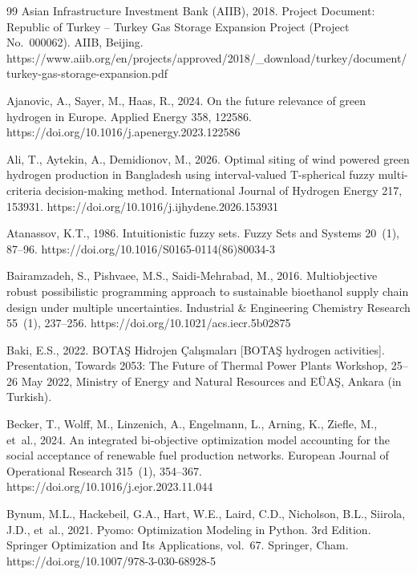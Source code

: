 \documentclass[preprint,12pt,authoryear]{elsarticle}
\begin{document}

\begin{thebibliography}{99}
Asian Infrastructure Investment Bank (AIIB), 2018. Project Document: Republic of Turkey -- Turkey Gas Storage Expansion Project (Project No.~000062). AIIB, Beijing. https://www.aiib.org/en/projects/approved/2018/\_download/turkey/document/turkey-gas-storage-expansion.pdf

Ajanovic, A., Sayer, M., Haas, R., 2024. On the future relevance of green hydrogen in Europe. Applied Energy 358, 122586. https://doi.org/10.1016/j.apenergy.2023.122586

Ali, T., Aytekin, A., Demidionov, M., 2026. Optimal siting of wind powered green hydrogen production in Bangladesh using interval-valued T-spherical fuzzy multi-criteria decision-making method. International Journal of Hydrogen Energy 217, 153931. https://doi.org/10.1016/j.ijhydene.2026.153931

Atanassov, K.T., 1986. Intuitionistic fuzzy sets. Fuzzy Sets and Systems 20~(1), 87--96. https://doi.org/10.1016/S0165-0114(86)80034-3

Bairamzadeh, S., Pishvaee, M.S., Saidi-Mehrabad, M., 2016. Multiobjective robust possibilistic programming approach to sustainable bioethanol supply chain design under multiple uncertainties. Industrial \& Engineering Chemistry Research 55~(1), 237--256. https://doi.org/10.1021/acs.iecr.5b02875

Baki, E.S., 2022. BOTA{\c{S}} Hidrojen {\c{C}}al{\i}{\c{s}}malar{\i} [BOTA{\c{S}} hydrogen activities]. Presentation, Towards 2053: The Future of Thermal Power Plants Workshop, 25--26 May 2022, Ministry of Energy and Natural Resources and E{\"U}A{\c{S}}, Ankara (in Turkish).

Becker, T., Wolff, M., Linzenich, A., Engelmann, L., Arning, K., Ziefle, M., et~al., 2024. An integrated bi-objective optimization model accounting for the social acceptance of renewable fuel production networks. European Journal of Operational Research 315~(1), 354--367. https://doi.org/10.1016/j.ejor.2023.11.044

Bynum, M.L., Hackebeil, G.A., Hart, W.E., Laird, C.D., Nicholson, B.L., Siirola, J.D., et~al., 2021. Pyomo: Optimization Modeling in Python. 3rd Edition. Springer Optimization and Its Applications, vol.~67. Springer, Cham. https://doi.org/10.1007/978-3-030-68928-5


\end{thebibliography}
\end{document}

